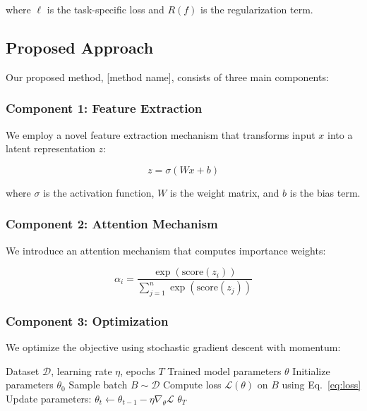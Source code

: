 \documentclass[10pt,twocolumn]{article}
\begin{document}
where $\ell$ is the task-specific loss and $R(f)$ is the regularization term.

\subsection{Proposed Approach}
Our proposed method, [method name], consists of three main components:

\subsubsection{Component 1: Feature Extraction}
We employ a novel feature extraction mechanism that transforms input $x$ into a latent representation $z$:

\begin{equation}
z = \sigma(Wx + b)
\label{eq:feature}
\end{equation}

where $\sigma$ is the activation function, $W$ is the weight matrix, and $b$ is the bias term.

\subsubsection{Component 2: Attention Mechanism}
We introduce an attention mechanism that computes importance weights:

\begin{equation}
\alpha_i = \frac{\exp(\text{score}(z_i))}{\sum_{j=1}^{n} \exp(\text{score}(z_j))}
\label{eq:attention}
\end{equation}

\subsubsection{Component 3: Optimization}
We optimize the objective using stochastic gradient descent with momentum:

\begin{algorithm}[H]
\caption{Training Algorithm for [Method Name]}
\label{alg:training}
\begin{algorithmic}[1]
\Require Dataset $\mathcal{D}$, learning rate $\eta$, epochs $T$
\Ensure Trained model parameters $\theta$
\State Initialize parameters $\theta_0$
    \State Sample batch $B \sim \mathcal{D}$
    \State Compute loss $\mathcal{L}(\theta)$ on $B$ using Eq.~\ref{eq:loss}
    \State Update parameters: $\theta_t \leftarrow \theta_{t-1} - \eta \nabla_\theta \mathcal{L}$
\EndFor
\State \Return $\theta_T$
\end{algorithmic}
\end{algorithm}
\end{document}
